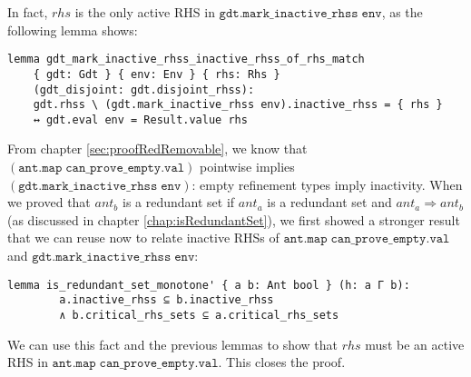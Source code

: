 In fact, $\mathit{rhs}$ is the only active RHS in $\mathtt{gdt.mark\_inactive\_rhss\;env}$, as the following lemma shows:

\begin{verbatim}
lemma gdt_mark_inactive_rhss_inactive_rhss_of_rhs_match
    { gdt: Gdt } { env: Env } { rhs: Rhs }
    (gdt_disjoint: gdt.disjoint_rhss):
    gdt.rhss \ (gdt.mark_inactive_rhss env).inactive_rhss = { rhs }
    ↔ gdt.eval env = Result.value rhs
\end{verbatim}

From chapter \ref{sec:proofRedRemovable}, we know that $(\mathtt{ant.map\;can\_prove\_empty.val})$ pointwise implies $(\mathtt{gdt.mark\_inactive\_rhss\;env})$:
empty refinement types imply inactivity.
When we proved that $\mathit{ant}_b$ is a redundant set if $\mathit{ant}_a$ is a redundant set and $\mathit{ant}_a \Rightarrow \mathit{ant}_b$ (as discussed in chapter \ref{chap:isRedundantSet}),
we first showed a stronger result that we can reuse now to relate inactive RHSs of $\mathtt{ant.map\;can\_prove\_empty.val}$ and $\mathtt{gdt.mark\_inactive\_rhss\;env}$:
\begin{verbatim}
lemma is_redundant_set_monotone' { a b: Ant bool } (h: a Γ b): 
        a.inactive_rhss ⊆ b.inactive_rhss
        ∧ b.critical_rhs_sets ⊆ a.critical_rhs_sets
\end{verbatim}

We can use this fact and the previous lemmas to show that $\mathit{rhs}$ must be an active RHS in $\mathtt{ant.map\;can\_prove\_empty.val}$.
This closes the proof.